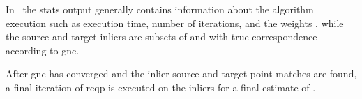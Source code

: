 In~ the stats output generally contains information about the algorithm execution such as execution time, number of iterations, and the weights , while the source  and target  inliers are subsets of  and  with true correspondence according to \gls{gnc}. \medskip

After \gls{gnc} has converged and the inlier source  and target  point matches are found, a final iteration of \gls{rcqp} is executed on the inliers for a final estimate of \tf[T]{\star}{}.






